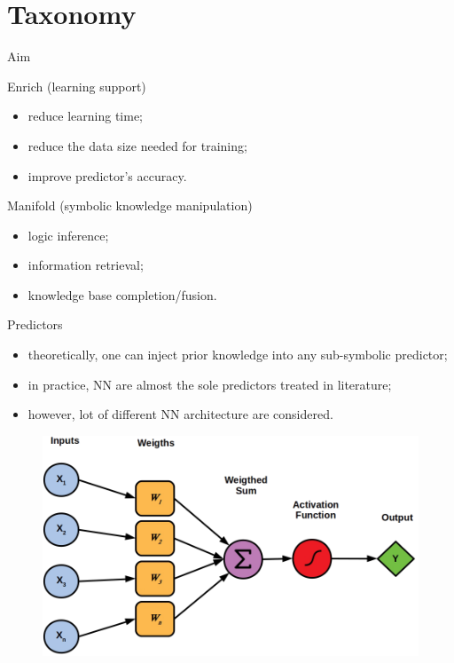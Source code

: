 \documentclass[presentation]{beamer}\mode<presentation>{\usetheme{AMSBolognaFC}}
\begin{document}
\section{Taxonomy}

\begin{frame}[c]{Aim}
    \begin{block}{Enrich (learning support)}
        \begin{itemize}
            \item reduce learning time;
            \item reduce the data size needed for training;
            \item improve predictor's accuracy.
        \end{itemize}
    \end{block}
    \begin{block}{Manifold (symbolic knowledge manipulation)}
        \begin{itemize}
            \item logic inference;
            \item information retrieval;
            \item knowledge base completion/fusion.
        \end{itemize}
    \end{block}
\end{frame}

\begin{frame}[c]{Predictors}
    \begin{itemize}
        \item theoretically, one can inject prior knowledge into any sub-symbolic predictor;
        \item in practice, NN are almost the sole predictors treated in literature;
        \item however, lot of different NN architecture are considered.
    \end{itemize}
    \begin{figure}
        \centering
        \includegraphics[width=.6\linewidth]{figures/neuron.png}
    \end{figure}
\end{frame}
\end{document}
